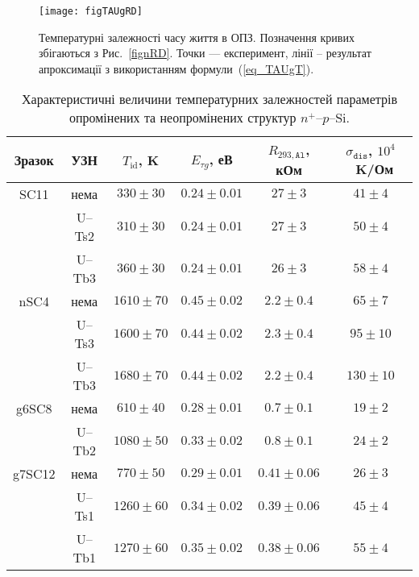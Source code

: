 \begin{figure}
\center
\texttt{[image: figTAUgRD]}%
\caption{\label{figTAUgRD}
Температурні залежності часу життя в ОПЗ.
Позначення кривих збігаються з Рис.~\ref{fignRD}.
Точки --- експеримент,
лінії -- результат апроксимації з використанням формули~(\ref{eq_TAUgT}).
}%
\end{figure}


\begin{table}[b]
\caption{\label{tabSSCparRD}Характеристичні величини температурних залежностей параметрів опромінених та неопромінених
структур $n^+$--$p$--Si.
}
\centering
\begin{tabular}{|c|c|c|c|c|c|} \hline
Зразок&УЗН&$T_{\mathrm{id}}$, K&$E_{\tau g}$, еВ&$R_{293,\mathtt{Al}}$, кОм&$\sigma_{\mathtt{dis}}$, $10^4$~K/Ом\\
\hline
SC11&нема&$330\pm30$&$0.24\pm0.01$&$27\pm3$&$41\pm4$\\ \hline
&U--Ts2&$310\pm30$&$0.24\pm0.01$&$27\pm3$&$50\pm4$\\ \hline
&U--Tb3&$360\pm30$&$0.24\pm0.01$&$26\pm3$&$58\pm4$\\ \hline
nSC4&нема&$1610\pm70$&$0.45\pm0.02$&$2.2\pm0.4$&$65\pm7$\\ \hline
&U--Ts3&$1600\pm70$&$0.44\pm0.02$&$2.3\pm0.4$&$95\pm10$\\ \hline
&U--Tb3&$1680\pm70$&$0.44\pm0.02$&$2.2\pm0.4$&$130\pm10$\\ \hline
g6SC8&нема&$610\pm40$&$0.28\pm0.01$&$0.7\pm0.1$&$19\pm2$\\ \hline
&U--Tb2&$1080\pm50$&$0.33\pm0.02$&$0.8\pm0.1$&$24\pm2$\\ \hline
g7SC12&нема&$770\pm50$&$0.29\pm0.01$&$0.41\pm0.06$&$26\pm3$\\ \hline
&U--Ts1&$1260\pm60$&$0.34\pm0.02$&$0.39\pm0.06$&$45\pm4$\\ \hline
&U--Tb1&$1270\pm60$&$0.35\pm0.02$&$0.38\pm0.06$&$55\pm4$\\ \hline
\end{tabular}
\end{table}


